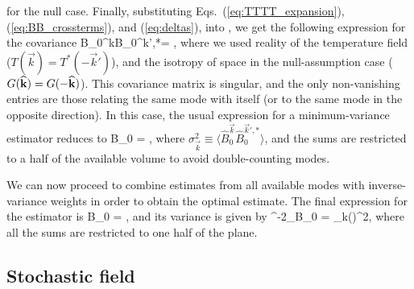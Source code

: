 \ega
\label{eq:BB_crossterms}
\eeq
for the null case.
Finally, substituting Eqs.~(\ref{eq:TTTT_expansion}), (\ref{eq:BB_crossterms}), and (\ref{eq:deltas}), into \eq{\ref{eq:mean_BB}}, we get the following expression for the covariance
\beq
\langle \widehat B_0^{\vec k}\widehat B_0^{{\vec k'},*}\rangle = ,
\label{eq:B_covariance}
\eeq
where we used reality of the temperature field ($T(\vec k)=T^*(-\vec k')$), and the isotropy of space in the null-assumption case ($G({\bf{\widehat k}})=G(-{\bf{\widehat k}})$).
This covariance matrix is singular, and the only non-vanishing entries are those relating the same mode with itself (or to the same mode in the opposite direction). In this case, the usual expression for a minimum-variance estimator reduces to 
\beq
\bga
\widehat B_0 = ,
\ega
\label{eq:B_mve}
\eeq
where $\sigma^2_{\vec k}\equiv\langle \widehat B_0^{\vec k}\widehat B_0^{{\vec k'},*}\rangle $, and the sums are restricted to a half of the available volume to avoid double-counting modes. %

We can now proceed to combine estimates from all available modes with inverse-variance weights in order to obtain the optimal estimate. The final expression for the estimator is 
\beq
\bga
\widehat B_0 = ,
\ega
\label{eq:B_estimator}
\eeq
and its variance is given by
\beq
\bga
\sigma^{-2}_{\widehat B_0} = \sum_{\vec k}\left(\right)^{2},
\ega
\label{eq:B_estimator_var}
\eeq
where all the sums are restricted to one half of the plane.

\subsection{Stochastic field}
\label{subsec:SI}

